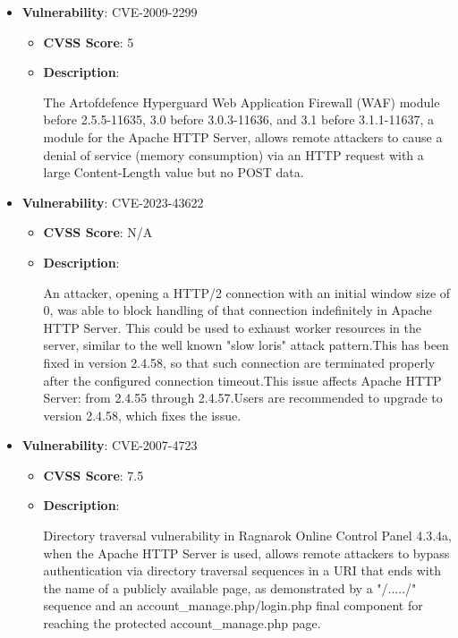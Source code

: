 \documentclass{article}
\begin{document}
\begin{itemize}
        \item \textbf{Vulnerability}: CVE-2009-2299
        \begin{itemize}
            \item \textbf{CVSS Score}:  5 
            \item \textbf{Description}:
            \parbox[t]{0.9\linewidth}{
                \ttfamily The Artofdefence Hyperguard Web Application Firewall (WAF) module before 2.5.5-11635, 3.0 before 3.0.3-11636, and 3.1 before 3.1.1-11637, a module for the Apache HTTP Server, allows remote attackers to cause a denial of service (memory consumption) via an HTTP request with a large Content-Length value but no POST data.
            }
        \end{itemize}
    
        \item \textbf{Vulnerability}: CVE-2023-43622
        \begin{itemize}
            \item \textbf{CVSS Score}:  N/A 
            \item \textbf{Description}:
            \parbox[t]{0.9\linewidth}{
                \ttfamily An attacker, opening a HTTP/2 connection with an initial window size of 0, was able to block handling of that connection indefinitely in Apache HTTP Server. This could be used to exhaust worker resources in the server, similar to the well known "slow loris" attack pattern.This has been fixed in version 2.4.58, so that such connection are terminated properly after the configured connection timeout.This issue affects Apache HTTP Server: from 2.4.55 through 2.4.57.Users are recommended to upgrade to version 2.4.58, which fixes the issue.
            }
        \end{itemize}
    
        \item \textbf{Vulnerability}: CVE-2007-4723
        \begin{itemize}
            \item \textbf{CVSS Score}:  7.5 
            \item \textbf{Description}:
            \parbox[t]{0.9\linewidth}{
                \ttfamily Directory traversal vulnerability in Ragnarok Online Control Panel 4.3.4a, when the Apache HTTP Server is used, allows remote attackers to bypass authentication via directory traversal sequences in a URI that ends with the name of a publicly available page, as demonstrated by a "/...../" sequence and an account\_manage.php/login.php final component for reaching the protected account\_manage.php page.
            }
        \end{itemize}
    

\end{itemize}
\end{document}
